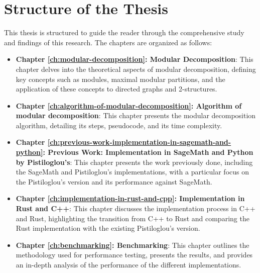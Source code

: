 \section{Structure of the Thesis}\label{sec:structure-of-the-thesis}

This thesis is structured to guide the reader through the comprehensive study and findings of this research.
The chapters are organized as follows:

\begin{itemize}
    \item \textbf{Chapter \ref{ch:modular-decomposition}: Modular Decomposition}: This chapter delves into the theoretical aspects of modular decomposition, defining key concepts such as modules, maximal modular partitions, and the application of these concepts to directed graphs and 2-structures.
    \item \textbf{Chapter \ref{ch:algorithm-of-modular-decomposition}: Algorithm of modular decomposition}: This chapter presents the modular decomposition algorithm, detailing its steps, pseudocode, and its time complexity.
    \item \textbf{Chapter \ref{ch:previous-work-implementation-in-sagemath-and-python}: Previous Work: Implementation in SageMath and Python by Pistiloglou’s}: This chapter presents the work previously done, including the SageMath and Pistiloglou’s implementations, with a particular focus on the Pistiloglou’s version and its performance against SageMath.
    \item \textbf{Chapter \ref{ch:implementation-in-rust-and-cpp}: Implementation in Rust and C++}: This chapter discusses the implementation process in C++ and Rust, highlighting the transition from C++ to Rust and comparing the Rust implementation with the existing Pistiloglou’s version.
    \item \textbf{Chapter \ref{ch:benchmarking}: Benchmarking}: This chapter outlines the methodology used for performance testing, presents the results, and provides an in-depth analysis of the performance of the different implementations.
\end{itemize}

